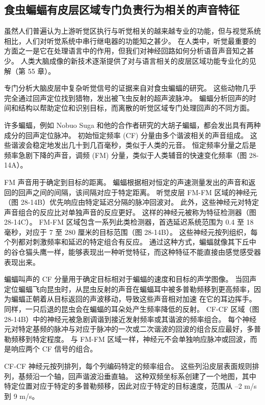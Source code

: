 \subsection{食虫蝙蝠有皮层区域专门负责行为相关的声音特征}
虽然人们普遍认为上游听觉区执行与听觉相关的越来越专业的功能，但与视觉系统相比，人们对听觉系统中串行继电器的功能知之甚少。 在人类中，听觉最重要的方面之一是它在处理语言中的作用，但我们对神经回路如何分析语音声音知之甚少。 人类大脑成像的新技术逐渐提供了对与语言相关的皮层区域功能专业化的见解（第 55 章）。

专门分析大脑皮层中复杂听觉信号的证据来自对食虫蝙蝠的研究。 这些动物几乎完全通过回声定位找到猎物，发出被飞虫反射的超声波脉冲。 蝙蝠分析回声的时间和结构以帮助定位和识别目标，而离散的听觉区域专门处理回声的不同方面。

许多蝙蝠，例如 Nobuo Suga 和他的合作者研究的大胡子蝙蝠，都会发出具有两种成分的回声定位脉冲。 初始恒定频率 (CF) 分量由多个谐波相关的声音组成。 这些谐波会稳定地发出几十到几百毫秒，类似于人类的元音。 恒定频率分量之后是频率急剧下降的声音，调频 (FM) 分量，类似于人类辅音的快速变化频率（图 28-14A）。

FM 声音用于确定到目标的距离。 蝙蝠根据相对恒定的声速测量发出的声音和返回的回声之间的间隔，该间隔对应于特定距离。 听觉皮层 FM-FM 区域的神经元（图 28-14B）优先响应由特定延迟分隔的脉冲回波对。 此外，这些神经元对特定声音组合的反应比对单独声音的反应更好。 这样的神经元被称为特征检测器（图 28-14C）。 FM-FM 区域包含一系列此类检测器，首选延迟系统范围为 0.4 至 18 毫秒，对应于 7 至 280 厘米的目标范围（图 28-14B）。 这些神经元按列组织，每个列都对刺激频率和延迟的特定组合有反应。 通过这种方式，蝙蝠就像其下丘中的谷仓猫头鹰一样，能够表现出一种听觉特征，而这种特征不能直接由感觉感受器表现出来。

蝙蝠叫声的 CF 分量用于确定目标相对于蝙蝠的速度和目标的声学图像。 当回声定位蝙蝠飞向昆虫时，从昆虫反射的声音在蝙蝠耳中被多普勒频移到更高频率，因为蝙蝠正朝着从目标返回的声波移动，导致这些声音相对加速 在它的耳边挥手。 同样，一只后退的昆虫会在蝙蝠的耳朵处产生频率降低的反射。 CF-CF 区域（图 28-14B）中的神经元被急剧调谐到接近发射频率或其谐波的频率组合。 每个神经元对特定基频的脉冲与对应于脉冲的一次或二次谐波的回波的组合反应最好，多普勒频移到特定程度。 与 FM-FM 区域一样，神经元不会单独响应脉冲或回波，而是响应两个 CF 信号的组合。

CF-CF 神经元按列排列，每个列编码特定的频率组合。 这些列沿皮层表面规则排列，基频沿一个轴，回声谐波沿垂直轴。 这种双频坐标系创建了一个地图，其中特定位置对应于特定的多普勒频移，因此对应于特定的目标速度，范围从 –2 m/s 到 9 m/s。

